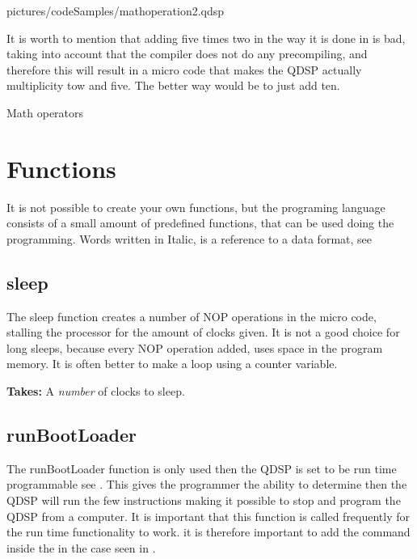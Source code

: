 
	{pictures/codeSamples/mathoperation2.qdsp}
	
It is worth to mention that adding five times two in the way it is done in  is bad, taking into account that the compiler does not do any precompiling, and therefore this will result in a micro code that makes the QDSP actually multiplicity tow and five. The better way would be to just add ten.

\begin{savenotes}
	\begin{table}[H]
		\centering
			
			\caption{Math operators}
		\label{mathOperators}
	\end{table}
\end{savenotes}


\section{Functions}\label{programmingLanguage_functions}
It is not possible to create your own functions, but the programing language consists of a small amount of predefined functions, that can be used doing the programming. Words written in Italic, is a reference to a data format, see 

\subsection{sleep}

The sleep function creates a number of NOP operations in the micro code, stalling the processor for the amount of clocks given. It is not a good choice for long sleeps, because every NOP operation added, uses space in the program memory. It is often better to make a loop using a counter variable.

\textbf{Takes:} A \textit{number} of clocks to sleep.

\subsection{runBootLoader}

The runBootLoader function is only used then the QDSP is set to be run time programmable see . This gives the programmer the ability to determine then the QDSP will run the few instructions making it possible to stop and program the QDSP from a computer. It is important that this function is called frequently for the run time functionality to work. it is therefore important to add the  command inside the  in the case seen in .

